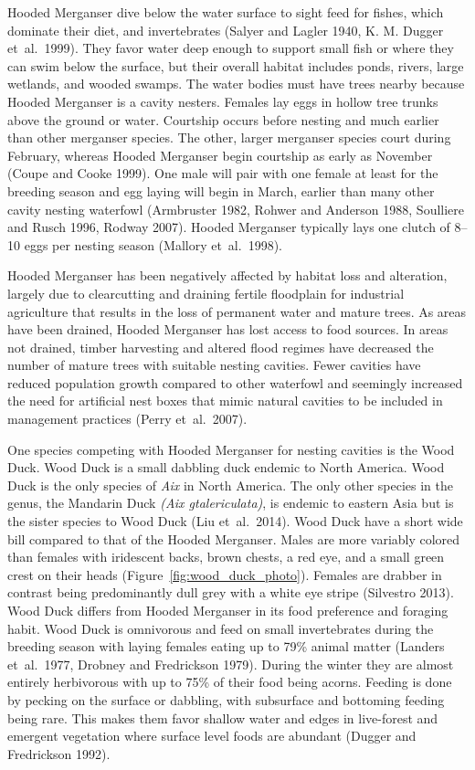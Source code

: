  


Hooded Merganser dive below the water surface to sight feed for fishes, which dominate their diet, and invertebrates (Salyer and Lagler 1940, K. M. Dugger et~al.~1999). They favor water deep enough to support small fish or where they can swim below the surface, but their overall habitat includes ponds, rivers, large wetlands, and wooded swamps. The water bodies must have trees nearby because Hooded Merganser is a cavity nesters. Females lay eggs in hollow tree trunks above the ground or water. Courtship occurs before nesting and much earlier than other merganser species. The other, larger merganser species court during February, whereas Hooded Merganser begin courtship as early as November (Coupe and Cooke 1999). One male will pair with one female at least for the breeding season and egg laying will begin in March, earlier than many other cavity nesting waterfowl (Armbruster 1982, Rohwer and Anderson 1988, Soulliere and Rusch 1996, Rodway 2007). Hooded Merganser typically lays one clutch of 8–10 eggs per nesting season (Mallory et~al.~1998).  

Hooded Merganser has been negatively affected by habitat loss and alteration, largely due to clearcutting and draining fertile floodplain for industrial agriculture that results in the loss of permanent water and mature trees. As areas have been drained, Hooded Merganser has lost access to food sources. In areas not drained, timber harvesting and altered flood regimes have decreased the number of mature trees with suitable nesting cavities. Fewer cavities have reduced population growth compared to other waterfowl and seemingly increased the need for artificial nest boxes that mimic natural cavities to be included in management practices (Perry et~al.~2007).

One species competing with Hooded Merganser for nesting cavities is the Wood Duck.  Wood Duck is a small dabbling duck endemic to North America. Wood Duck is the only species of \textit{Aix} in North America. The only other species in the genus, the Mandarin Duck \textit{(Aix gtalericulata)}, is endemic to eastern Asia but is the sister species to Wood Duck (Liu et~al.~2014). Wood Duck have a short wide bill compared to that of the Hooded Merganser. Males are more variably colored than females with iridescent backs, brown chests, a red eye, and a small green crest on their heads (Figure~\ref{fig:wood_duck_photo}). Females are drabber in contrast being predominantly dull grey with a white eye stripe (Silvestro 2013). Wood Duck differs from Hooded Merganser in its food preference and foraging habit. Wood Duck is omnivorous and feed on small invertebrates during the breeding season with laying females eating up to 79\% animal matter (Landers et~al.~1977, Drobney and Fredrickson 1979). During the winter they are almost entirely herbivorous with up to 75\% of their food being acorns. Feeding is done by pecking on the surface or dabbling, with subsurface and bottoming feeding being rare. This makes them favor shallow water and edges in live-forest and emergent vegetation where surface level foods are abundant (Dugger and Fredrickson 1992).  

